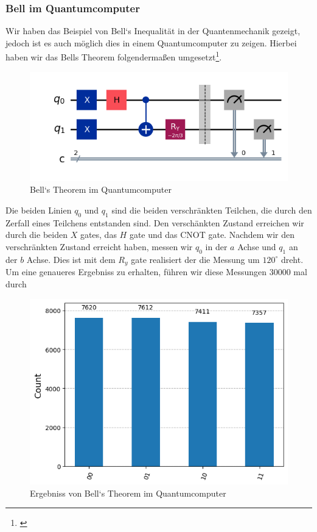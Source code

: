\subsubsection{Bell im Quantumcomputer}
\label{subsubsec:bell_quantumcomputer}
Wir haben das Beispiel von Bell`s Inequalität in der Quantenmechanik gezeigt, jedoch ist es auch möglich dies in einem Quantumcomputer zu zeigen.
Hierbei haben wir das Bells Theorem folgendermaßen umgesetzt\footnote{\cite{qiskit_entanglement_2024}}.
\begin{figure}[H]
    \centering
    \includegraphics[width=0.9\linewidth]{img/BellCircuit.png}
    \caption{Bell`s Theorem im Quantumcomputer}
    \label{fig:BellCircuit}
\end{figure}

Die beiden Linien $q_0$ und $q_1$ sind die beiden verschränkten Teilchen, die durch den Zerfall eines Teilchens entstanden sind.
Den verschänkten Zustand erreichen wir durch die beiden $X$ gates, das $H$ gate und das CNOT gate.
Nachdem wir den verschränkten Zustand erreicht haben, messen wir $q_0$ in der $a$ Achse und $q_1$ an der $b$ Achse. Dies ist mit dem $R_y$ gate realisiert der die Messung um $120^\circ$ dreht.\\

Um eine genaueres Ergebniss zu erhalten, führen wir diese Messungen 30000 mal durch
\begin{figure}[H]
    \centering
    \includegraphics[width=0.8\linewidth]{img/BellResult.png}
    \caption{Ergebniss von Bell`s Theorem im Quantumcomputer}
    \label{fig:BellResult}
\end{figure}

